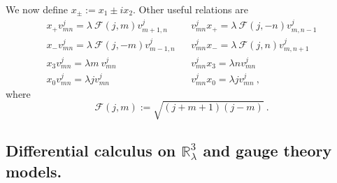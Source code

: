 \documentclass[a4paper,11pt,twoside]{article}
\numberwithin{equation}{section}
\theoremstyle{nonumberplain}
\newcounter{and}
\begin{document}
%
We now define $x_\pm := x_1\pm i x_2$. Other useful relations \cite{vit-wal-12} are%
%
\begin{eqnarray}
x_+v^j_{mn} = \lambda \ \mathcal{F}(j,m) v^j_{m+1, n}  
&& v^j_{mn} x_+ = \lambda \ \mathcal{F}(j,-n) v^j_{m, n -1} \nonumber \\
x_- v^j_{mn} = \lambda \ \mathcal{F}(j,-m) v^j_{m-1,n}  
&& v^j_{mn} x_- = \lambda \ \mathcal{F}(j,n) v^j_{m,n +1} \nonumber \\
x_3 v^j_{mn} = \lambda m \ v^j_{mn}
&& v^j_{mn} x_3 = \lambda n v^j_{mn} \nonumber \\
x_0 v^j_{mn} = \lambda j v^j_{mn}
&& v^j_{mn} x_0 = \lambda j v^j_{mn} \ , \label{x0-commut}
\end{eqnarray}
%
where%
%
\begin{equation}
\mathcal{F}(j,m):=\sqrt{(j+m+1)(j-m)} \ . \label{fjm}
\end{equation}


\subsection{\texorpdfstring{Differential calculus on $\mathbb{R}^3_\lambda$ and gauge theory models.}{Family of gauge theories}} \label{subsection22}
\end{document}
